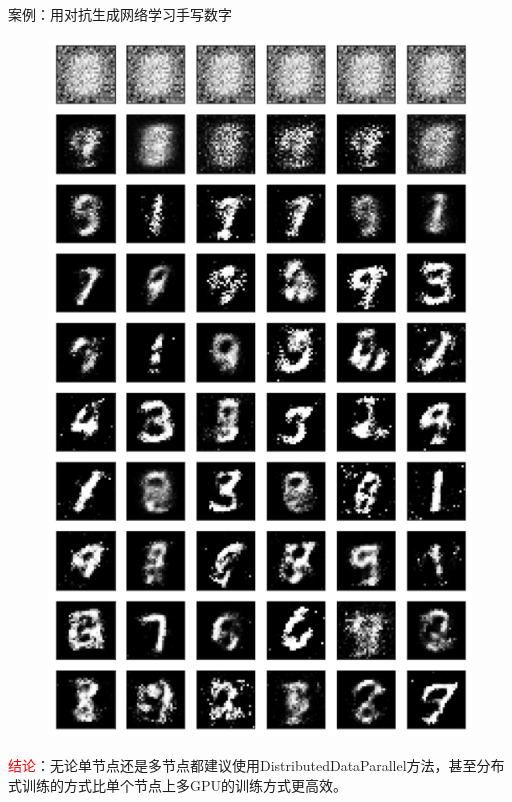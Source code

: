 \documentclass[9pt,t]{beamer} %
\begin{document}
\begin{frame}[t]{案例：用对抗生成网络学习手写数字}
\begin{minipage}[t]{0.4 \textwidth}
\begin{figure}
\includegraphics[width=\textwidth, height=0.9\textheight]{generated-digit.png}
\end{figure}
\end{minipage}
\textcolor{red}{结论}：无论单节点还是多节点都建议使用DistributedDataParallel方法，甚至分布式训练的方式比单个节点上多GPU的训练方式更高效。
\end{frame}
\end{document}

